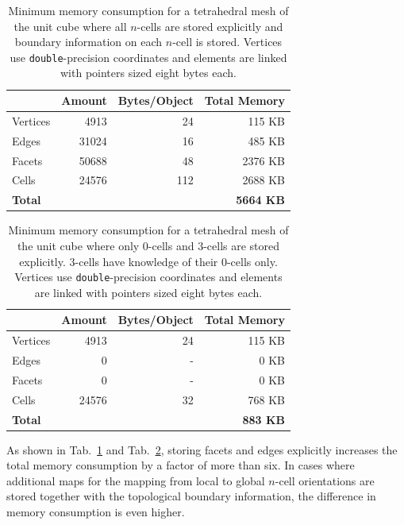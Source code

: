 \begin{table}[tb]
 \centering
 \begin{tabular}{|l|r|r|r|}
  \hline
         & Amount      & Bytes/Object         & Total Memory \\
  \hline
  Vertices & 4913 & 24 & 115 KB \\
  \hline
  Edges   & 31024 & 16 & 485 KB \\
  \hline
  Facets  & 50688 & 48 & 2376 KB \\
  \hline
  Cells   & 24576 & 112 & 2688 KB \\
  \hline
  \textbf{Total}  &       &     &  \textbf{5664 KB} \\
  \hline
 \end{tabular}
 \caption{Minimum memory consumption for a tetrahedral mesh of the unit cube where all $n$-cells are stored explicitly and boundary information on each $n$-cell is stored. Vertices use \lstinline|double|-precision coordinates and elements are linked with pointers sized eight bytes each.}
 \label{tab:full-mesh-memory}
\end{table}

\begin{table}[tb]
 \centering
 \begin{tabular}{|l|r|r|r|}
  \hline
         & Amount      & Bytes/Object         & Total Memory \\
  \hline
  Vertices & 4913 & 24 & 115 KB \\
  \hline
  Edges   & 0 & - & 0 KB \\
  \hline
  Facets  & 0 & - & 0 KB \\
  \hline
  Cells   & 24576 & 32 & 768 KB \\
  \hline
  \textbf{Total}  &       &     &  \textbf{883 KB} \\
  \hline
 \end{tabular}
 \caption{Minimum memory consumption for a tetrahedral mesh of the unit cube where only $0$-cells and $3$-cells are stored explicitly. $3$-cells have knowledge of their $0$-cells only. Vertices use \lstinline|double|-precision coordinates and elements are linked with pointers sized eight bytes each.}
 \label{tab:slim-mesh-memory}
\end{table}

As shown in Tab.~\ref{tab:full-mesh-memory} and Tab.~\ref{tab:slim-mesh-memory}, storing facets and edges explicitly increases the total memory consumption by a factor of more than six. In cases where additional maps for the mapping from local to global $n$-cell orientations are stored together with the topological boundary information, the difference in memory consumption is even higher.

